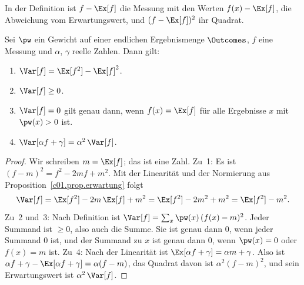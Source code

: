 
In der Definition ist $f - \Ex[f]$ die Messung mit den Werten $f(x) - \Ex[f]$, die
Abweichung vom Erwartungswert, und $(f - \Ex[f])^2$ ihr Quadrat.

\begin{proposition}\label{c01.prop.varianz}
  Sei $\pw$ ein Gewicht auf einer endlichen Ergebnismenge $\Outcomes$, $f$ eine Messung
  und $\alpha$, $\gamma$ reelle Zahlen. Dann gilt:
  \begin{enumerate}
    \item $\Var[f] = \Ex[f^2] - \Ex[f]^2$.
    \item $\Var[f] \geq 0$.
    \item $\Var[f] = 0$ gilt genau dann, wenn $f(x) = \Ex[f]$ für alle Ergebnisse $x$ mit
      $\pw(x) > 0$ ist.
    \item $\Var[\alpha f + \gamma] = \alpha^2\, \Var[f]$.
  \end{enumerate}
\end{proposition}
\begin{proof}
  Wir schreiben $m = \Ex[f]$; das ist eine Zahl. Zu~1: Es ist
  $(f - m)^2 = f^2 - 2 m f + m^2$. Mit der Linearität und der Normierung aus
  Proposition~\ref{c01.prop.erwartung} folgt
  \begin{equation}\label{c01.eq.varianzformel}
    \Var[f] = \Ex[f^2] - 2m\, \Ex[f] + m^2 = \Ex[f^2] - 2m^2 + m^2 = \Ex[f^2] - m^2 .
  \end{equation}
  Zu~2 und~3: Nach Definition ist $\Var[f] = \sum_x \pw(x)\,(f(x) - m)^2$. Jeder Summand
  ist $\geq 0$, also auch die Summe. Sie ist genau dann $0$, wenn jeder Summand $0$ ist,
  und der Summand zu $x$ ist genau dann $0$, wenn $\pw(x) = 0$ oder $f(x) = m$ ist.
  Zu~4: Nach der Linearität ist $\Ex[\alpha f + \gamma] = \alpha m + \gamma$. Also ist
  $\alpha f + \gamma - \Ex[\alpha f + \gamma] = \alpha (f - m)$, das Quadrat davon ist
  $\alpha^2 (f - m)^2$, und sein Erwartungswert ist $\alpha^2\, \Var[f]$.
\end{proof}

